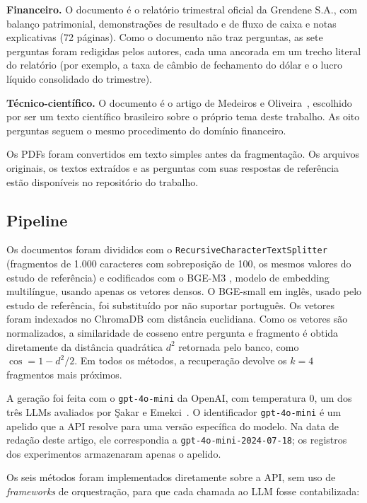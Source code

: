 \textbf{Financeiro.} O documento é o relatório trimestral oficial da Grendene S.A., com balanço patrimonial, demonstrações de resultado e de fluxo de caixa e notas explicativas (72 páginas). Como o documento não traz perguntas, as sete perguntas foram redigidas pelos autores, cada uma ancorada em um trecho literal do relatório (por exemplo, a taxa de câmbio de fechamento do dólar e o lucro líquido consolidado do trimestre).

\textbf{Técnico-científico.} O documento é o artigo de Medeiros e Oliveira~\cite{medeiros2025embeddings}, escolhido por ser um texto científico brasileiro sobre o próprio tema deste trabalho. As oito perguntas seguem o mesmo procedimento do domínio financeiro.

Os PDFs foram convertidos em texto simples antes da fragmentação. Os arquivos originais, os textos extraídos e as perguntas com suas respostas de referência estão disponíveis no repositório do trabalho.

\subsection{Pipeline}

Os documentos foram divididos com o \texttt{RecursiveCharacterTextSplitter} (fragmentos de 1.000 caracteres com sobreposição de 100, os mesmos valores do estudo de referência) e codificados com o BGE-M3 \cite{chen2024bgem3}, modelo de embedding multilíngue, usando apenas os vetores densos. O BGE-small em inglês, usado pelo estudo de referência, foi substituído por não suportar português. Os vetores foram indexados no ChromaDB com distância euclidiana. Como os vetores são normalizados, a similaridade de cosseno entre pergunta e fragmento é obtida diretamente da distância quadrática $d^2$ retornada pelo banco, como $\cos = 1 - d^2/2$. Em todos os métodos, a recuperação devolve os $k = 4$ fragmentos mais próximos.

A geração foi feita com o \texttt{gpt-4o-mini} da OpenAI, com temperatura 0, um dos três LLMs avaliados por Şakar e Emekci~\cite{sakar2025rag}. O identificador \texttt{gpt-4o-mini} é um apelido que a API resolve para uma versão específica do modelo. Na data de redação deste artigo, ele correspondia a \texttt{gpt-4o-mini-2024-07-18}; os registros dos experimentos armazenaram apenas o apelido.

Os seis métodos foram implementados diretamente sobre a API, sem uso de \emph{frameworks} de orquestração, para que cada chamada ao LLM fosse contabilizada:

